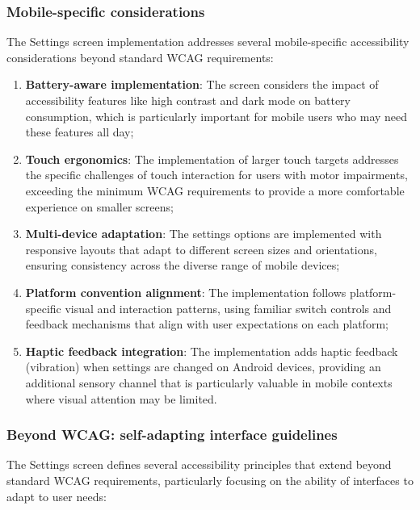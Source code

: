 \subsubsection{Mobile-specific considerations}

The Settings screen implementation addresses several mobile-specific accessibility considerations beyond standard WCAG requirements:

\begin{enumerate}
    \item \textbf{Battery-aware implementation}: The screen considers the impact of accessibility features like high contrast and dark mode on battery consumption, which is particularly important for mobile users who may need these features all day;
    
    \item \textbf{Touch ergonomics}: The implementation of larger touch targets addresses the specific challenges of touch interaction for users with motor impairments, exceeding the minimum WCAG requirements to provide a more comfortable experience on smaller screens;
    
    \item \textbf{Multi-device adaptation}: The settings options are implemented with responsive layouts that adapt to different screen sizes and orientations, ensuring consistency across the diverse range of mobile devices;
    
    \item \textbf{Platform convention alignment}: The implementation follows platform-specific visual and interaction patterns, using familiar switch controls and feedback mechanisms that align with user expectations on each platform;
    
    \item \textbf{Haptic feedback integration}: The implementation adds haptic feedback (vibration) when settings are changed on Android devices, providing an additional sensory channel that is particularly valuable in mobile contexts where visual attention may be limited.
\end{enumerate}

\subsubsection{Beyond WCAG: self-adapting interface guidelines}

The Settings screen defines several accessibility principles that extend beyond standard WCAG requirements, particularly focusing on the ability of interfaces to adapt to user needs:

